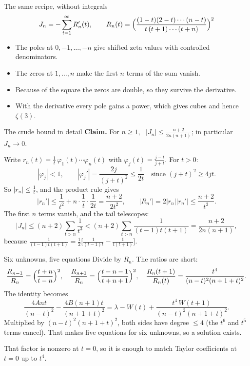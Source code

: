 \documentclass[aspectratio=169,11pt]{beamer}
\begin{document}
\begin{frame}{The same recipe, without integrals}
  \[
    J_n=-\sum_{t=1}^\infty R_n'(t),\qquad R_n(t)=\Bigl(\frac{(1-t)(2-t)\cdots(n-t)}{t\,(t+1)\cdots(t+n)}\Bigr)^2
  \]
  \begin{itemize}
    \item The poles at $0,-1,\dots,-n$ give shifted zeta values with controlled denominators.
    \item The zeros at $1,\dots,n$ make the first $n$ terms of the sum vanish.
    \item Because of the square the zeros are double, so they survive the derivative.
    \item With the derivative every pole gains a power, which gives cubes and hence $\zeta(3)$.
  \end{itemize}
\end{frame}

\begin{frame}{The crude bound in detail}
  \textbf{Claim.} For $n\ge1$, \ $|J_n|\le\frac{n+2}{2n(n+1)}$; in particular $J_n\to0$.

  Write $r_n(t)=\frac1t\,\varphi_1(t)\cdots\varphi_n(t)$ with $\varphi_j(t)=\frac{j-t}{j+t}$. For $t>0$:
  \[
    |\varphi_j|<1,\qquad |\varphi_j'|=\frac{2j}{(j+t)^2}\le\frac1{2t}\quad\text{since }(j+t)^2\ge4jt .
  \]
  \pause
  So $|r_n|\le\frac1t$, and the product rule gives
  \[
    |r_n'|\le\frac1{t^2}+n\cdot\frac1t\cdot\frac1{2t}=\frac{n+2}{2t^2},
    \qquad |R_n'|=2|r_n||r_n'|\le\frac{n+2}{t^3}.
  \]
  \pause
  The first $n$ terms vanish, and the tail telescopes:
  \[
    |J_n|\le(n+2)\sum_{t>n}\frac1{t^3}<(n+2)\sum_{t>n}\frac1{(t-1)t(t+1)}=\frac{n+2}{2n(n+1)},
  \]
  because $\frac1{(t-1)t(t+1)}=\frac12\bigl[\frac1{(t-1)t}-\frac1{t(t+1)}\bigr]$.
\end{frame}

\begin{frame}{Six unknowns, five equations}
  Divide by $R_n$. The ratios are short:
  \[
    \frac{R_{n-1}}{R_n}=\Bigl(\frac{t+n}{t-n}\Bigr)^2,\quad
    \frac{R_{n+1}}{R_n}=\Bigl(\frac{t-n-1}{t+n+1}\Bigr)^2,\quad
    \frac{R_n(t+1)}{R_n(t)}=\frac{t^4}{(n-t)^2(n+1+t)^2}.
  \]
  The identity becomes
  \[
    \frac{4Ant}{(n-t)^2}-\frac{4B(n+1)t}{(n+1+t)^2}=\lambda-W(t)+\frac{t^4\,W(t+1)}{(n-t)^2(n+1+t)^2}.\tag{$\star$}
  \]
  Multiplied by $(n-t)^2(n+1+t)^2$, both sides have degree $\le4$ (the $t^6$ and $t^5$ terms
  cancel). That makes five equations for six unknowns, so a solution exists.
  \medskip

  That factor is nonzero at $t=0$, so it is enough to match Taylor coefficients at $t=0$ up to $t^4$.
\end{frame}
\end{document}
